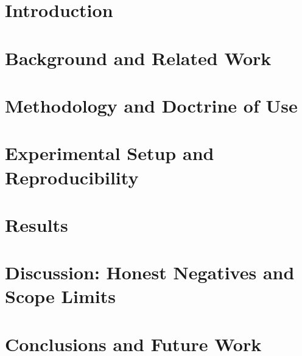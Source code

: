 \documentclass[symmetry,article,submit,pdftex,oneauthor]{Definitions/mdpi}
\begin{document}
\maketitle

\section{Introduction}
\label{sec:intro}


\section{Background and Related Work}
\label{sec:background}


\section{Methodology and Doctrine of Use}
\label{sec:method}


\section{Experimental Setup and Reproducibility}
\label{sec:setup}


\section{Results}
\label{sec:results}


\section{Discussion: Honest Negatives and Scope Limits}
\label{sec:discussion}


\section{Conclusions and Future Work}
\label{sec:conclusion}

\end{document}
